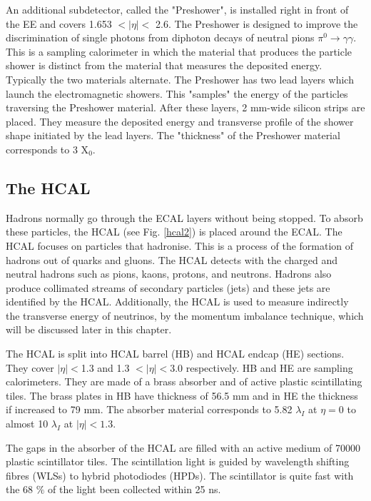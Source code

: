 \begin{normalsize}
An additional subdetector, called the "Preshower", is installed right in front of the EE and covers 1.653 $ < | \eta |  < $ 2.6. The Preshower is designed to improve the discrimination of single photons from diphoton decays of neutral pions $\pi^0 \rightarrow \gamma \gamma$. This is a sampling calorimeter in which the material that produces the particle shower is distinct from the material that measures the deposited energy. Typically the two materials alternate. 
The Preshower has two lead layers which launch the electromagnetic showers. This "samples" the energy of the particles traversing the Preshower material.  After these layers, 2 mm-wide silicon strips are placed. They measure the deposited energy and transverse profile of the shower shape initiated by the lead layers. The "thickness" of the Preshower material corresponds to 3 X$_0$.



\subsection{The HCAL}

Hadrons normally go through the ECAL layers without being stopped. To absorb these particles, the HCAL \cite{HCAL_TDR} (see Fig. \ref{hcal2}) is placed around the ECAL. The HCAL focuses on particles that hadronise. This is a process of the formation of hadrons out of quarks and gluons. The HCAL detects with the charged and neutral hadrons such as pions, kaons, protons, and neutrons. Hadrons also produce collimated streams of secondary particles (jets) and these jets are identified by the HCAL. Additionally, the HCAL is used to measure indirectly the transverse energy of neutrinos, by the momentum imbalance technique, which will be discussed later in this chapter. 

The HCAL is split into HCAL barrel (HB) and HCAL endcap (HE) sections. They cover $ |\eta| < $1.3 and 1.3 $< |\eta| < $3.0 respectively. HB and HE are sampling calorimeters. They are made of a brass absorber and of active plastic scintillating tiles. The brass plates in HB have thickness of 56.5 mm and in HE the thickness if increased to 79 mm. The absorber material corresponds to 5.82 $\lambda_I$ at $\eta = 0$ to almost 10 $\lambda_I$ at $|\eta| < 1.3$.

The gaps in the absorber of the HCAL are filled with an active medium of 70000 plastic scintillator tiles. The scintillation light is guided by wavelength shifting fibres (WLSs) to hybrid photodiodes (HPDs). The scintillator is quite fast with the 68 $\%$ of the light been collected within 25 ns.


\end{normalsize}
